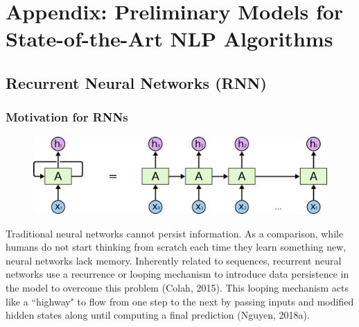 \section{Appendix: Preliminary Models for State-of-the-Art NLP Algorithms} \label{app:Appendix_BasicsRNNLSTM}

\subsection{Recurrent Neural Networks (RNN)} \label{sec:RNN}


\subsubsection{Motivation for RNNs}

{
\begin{figure}
\begin{center}
    \vspace{-20pt}
    \includegraphics[width=\linewidth]{imgs/rnn_colah_unrolled.png}
\end{center}
\vspace{-15pt}
\label{fig:rnnUnrolledView}
\end{figure}


Traditional neural networks cannot persist information. As a comparison, while humans do not start thinking from scratch each time they learn something new, neural networks lack memory. Inherently related to sequences, recurrent neural networks use a recurrence or looping mechanism to introduce data persistence in the model to overcome this problem (Colah, 2015). This looping mechanism acts like a ``highway" to flow from one step to the next by passing inputs and modified hidden states along until computing a final prediction (Nguyen, 2018a). 

}



